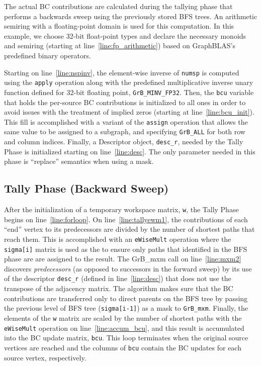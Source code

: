 The actual BC contributions are calculated during the tallying phase that 
performs a backwards sweep using the previously stored BFS trees.  An 
arithmetic semiring with a floating-point
domain is used for this computation.  In this example, we choose 32-bit float-point types and declare
the necessary monoids and semiring (starting at line~\ref{line:fp_arithmetic})
based on GraphBLAS's predefined binary operators.

Starting on line~\ref{line:nspinv}, the element-wise inverse of {\tt numsp} is 
computed using the {\tt apply} operation along with the predefined multiplicative inverse
unary function defined for 32-bit floating point, {\tt GrB\_MINV\_FP32}.
Then, the {\tt bcu} variable that holds the per-source BC contributions is initialized
to all ones in order to avoid issues with the treatment of implied zeros (starting at 
line~\ref{line:bcu_init}). This fill is accomplished with a variant of the {\tt assign} 
operation that allows the same value to be assigned to a subgraph, and specifying 
{\tt GrB\_ALL} for both row and column indices.
Finally, a Descriptor object, {\tt desc\_r}, needed by the Tally Phase is 
initialized starting on line~\ref{line:desc}.  The only parameter needed in this
phase is ``replace'' semantics when using a mask. 


\subsection{Tally Phase (Backward Sweep)}

After the initialization of a temporary workspace matrix, {\tt w}, the Tally
Phase begins on line~\ref{line:forloop}.  
On line~\ref{line:tallyewm1}, the contributions of each ``end'' vertex to its 
predecessors are divided by the number of shortest paths that reach them. This is accomplished
with an {\tt eWiseMult} operation where the {\tt sigma[i]} matrix is
used as the to ensure only paths that identified in the BFS phase are are assigned to
the result.
The GrB\_mxm call on line~\ref{line:mxm2} discovers \emph{predecessors} (as opposed to 
successors in the forward sweep) by its use of the descriptor {\tt desc\_r} 
(defined in line~\ref{line:desc}) that does not use the transpose of the 
adjacency matrix. The algorithm makes sure that the BC contributions are 
transferred only to direct parents on the BFS tree by passing the previous 
level of BFS tree ({\tt sigma[i-1]}) as a mask to {\tt GrB\_mxm}. 
Finally, the elements of the {\tt w} matrix are scaled by the number of shortest
paths with the {\tt eWiseMult} operation on line~\ref{line:accum_bcu}, and this result
is accumulated into the BC update matrix, {\tt bcu}.
This loop terminates when the original source vertices are reached and the columns
of {\tt bcu} contain the BC updates for each source vertex, respectively.

